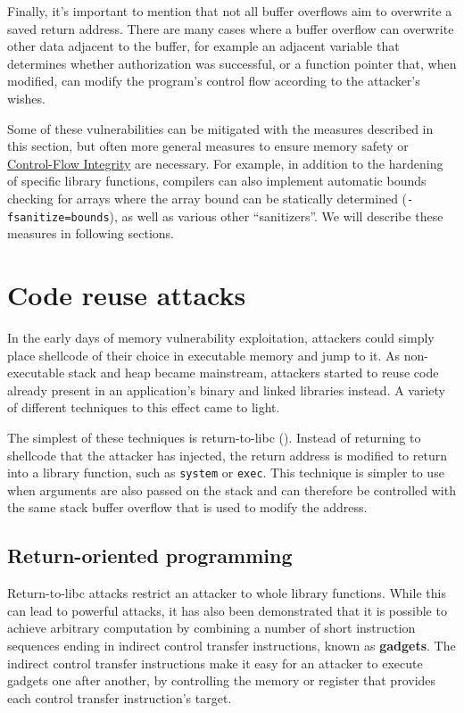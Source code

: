 \documentclass[
  a4paper,
]{report}
\begin{document}
Finally, it's important to mention that not all buffer overflows aim to
overwrite a saved return address. There are many cases where a buffer
overflow can overwrite other data adjacent to the buffer, for example an
adjacent variable that determines whether authorization was successful,
or a function pointer that, when modified, can modify the program's
control flow according to the attacker's wishes.

Some of these vulnerabilities can be mitigated with the measures
described in this section, but often more general measures to ensure
memory safety or \hyperref[control-flow-integrity-cfi]{Control-Flow
Integrity} are necessary. For example, in addition to the hardening of
specific library functions, compilers can also implement automatic
bounds checking for arrays where the array bound can be statically
determined (\texttt{-fsanitize=bounds}), as well as various other
``sanitizers''. We will describe these measures in following sections.

\section{Code reuse attacks}\label{code-reuse-attacks}

In the early days of memory vulnerability exploitation, attackers could
simply place
\label{__index_entry_14}{shellcode} of
their choice in executable memory and jump to it. As non-executable
stack and heap became mainstream, attackers started to reuse code
already present in an application's binary and linked libraries instead.
A variety of different techniques to this effect came to light.

The simplest of these techniques is return-to-libc
(). Instead of returning to
shellcode that the attacker has injected, the return address is modified
to return into a library function, such as \texttt{system} or
\texttt{exec}. This technique is simpler to use when arguments are also
passed on the stack and can therefore be controlled with the same stack
buffer overflow that is used to modify the address.

\subsection{Return-oriented
programming}\label{return-oriented-programming}

Return-to-libc attacks restrict an attacker to whole library functions.
While this can lead to powerful attacks, it has also been demonstrated
that it is possible to achieve arbitrary computation by combining a
number of short instruction sequences ending in indirect control
transfer instructions, known as
\textbf{\label{__index_entry_15}{gadgets}}.
The indirect control transfer instructions make it easy for an attacker
to execute gadgets one after another, by controlling the memory or
register that provides each control transfer instruction's target.
\end{document}
